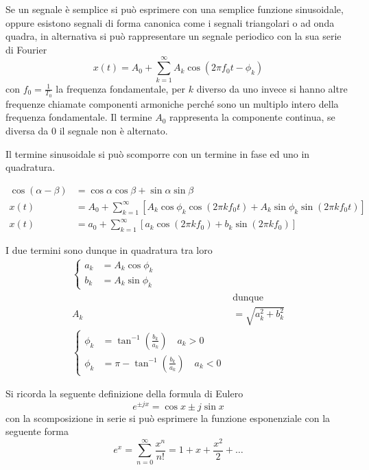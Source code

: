 Se un segnale è semplice si può esprimere con una semplice funzione
sinusoidale, oppure esistono segnali di forma canonica come i segnali
triangolari o ad onda quadra, in alternativa si può rappresentare un segnale
periodico con la sua serie di Fourier
\begin{equation}
 x(t) = A_0 + \sum_{k=1}^{\infty} A_k \cos \left( 2\pi f_0 t - \phi_k \right)
\end{equation}
con $f_0= \frac{1}{T_0}$ la frequenza fondamentale, per $k$ diverso da uno
invece si hanno altre frequenze chiamate componenti armoniche perché sono un
multiplo intero della frequenza fondamentale.
Il termine $A_0$ rappresenta la componente continua, se diversa da 0 il segnale
non è alternato.

Il termine sinusoidale si può scomporre con un termine in fase ed uno in
quadratura.

\begin{equation}\begin{aligned}
 \cos(\alpha-\beta) &= \cos\alpha\cos\beta+\sin\alpha\sin\beta \\
 x(t) &= A_0 + \sum_{k=1}^{\infty} \left[ A_k\cos\phi_k\cos(2\pi k f_0 t) +
A_k\sin\phi_k\sin(2\pi k f_0t) \right] \\
x(t) &= a_0 + \sum_{k=1}^{\infty}\left[a_k\cos(2\pi k f_0) + b_k\sin(2\pi k
f_0)\right]
\end{aligned}
 \end{equation}

I due termini sono dunque in quadratura tra loro
\begin{equation*}
\begin{aligned}
\left\{\begin{aligned}
a_k &= A_k\cos\phi_k\\
b_k &= A_k\sin\phi_k
\end{aligned}\right. \\
&\text{dunque}\\
A_k &= \sqrt{a_k^2 + b_k^2}\\ \left\{
\begin{aligned}
\phi_k &= \tan^{-1}\left(\frac{b_k}{a_k}\right) \quad a_k > 0 \\
 \phi_k &=\pi - \tan^{-1} \left(\frac{b_k}{a_k}\right) \quad a_k < 0
 \end{aligned}\right.
\end{aligned}
\end{equation*}

Si ricorda la seguente definizione della formula di Eulero
\begin{equation}
 e^{\pm jx} = \cos{x} \pm j\sin{x}
\end{equation}
con la scomposizione in serie si può esprimere la funzione esponenziale
con la seguente forma
\begin{equation*}
e^x = \sum_{n=0}^{\infty} \frac{x^n}{n!} = 1+x+\frac{x^2}{2}+ \dots
\end{equation*}

